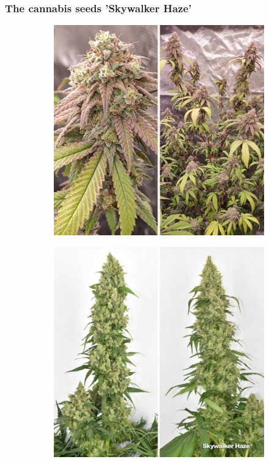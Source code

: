 \documentclass[12pt, aspectratio=1610]{beamer}
\begin{document}
    \begin{frame}
        \frametitle{The cannabis seeds 'Skywalker Haze'}
        \begin{figure}
            \begin{subfigure}[t]{.48\textwidth}
                \includegraphics[width=\linewidth]{../lab_report/DUTCH-PASSION_Skywalker-Haze_1}
            \end{subfigure}
            \hfill
            \begin{subfigure}[t]{.48\textwidth}
                \includegraphics[width=\linewidth]{../lab_report/DUTCH-PASSION_Skywalker-Haze_2}

\end{subfigure}
\end{figure}
\end{frame}
\end{document}
